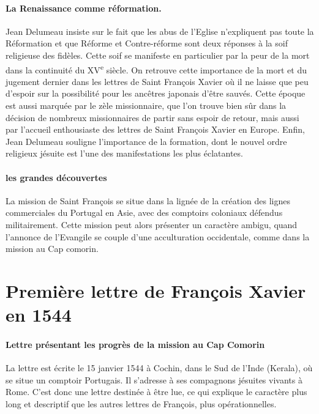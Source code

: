 \paragraph{La Renaissance comme réformation.} Jean Delumeau insiste sur le fait que les abus de l'Eglise n'expliquent pas toute la Réformation et que Réforme et Contre-réforme sont deux réponses à la soif religieuse des fidèles. Cette soif se manifeste en particulier par la peur de la mort dans la continuité du XV\textsuperscript{e} siècle. On retrouve  cette importance de la mort et du jugement dernier dans les lettres de Saint François Xavier où il ne laisse que peu d'espoir sur la possibilité pour les ancêtres japonais d'être sauvés. Cette époque est aussi marquée par le zèle missionnaire, que l'on trouve bien sûr dans la décision de nombreux missionnaires de partir sans espoir de retour, mais aussi par l'accueil enthousiaste des lettres de Saint François Xavier en Europe. Enfin, Jean Delumeau souligne l'importance de la formation, dont le nouvel ordre religieux jésuite est l'une des manifestations les plus éclatantes.



\paragraph{les grandes découvertes} La mission de Saint François se situe dans la lignée de la création des lignes commerciales du Portugal en Asie, avec des comptoirs coloniaux défendus militairement. Cette mission peut alors présenter un caractère ambigu, quand l'annonce de l'Evangile se couple d'une acculturation occidentale, comme dans la mission au Cap comorin. 



\section{Première lettre de François Xavier en 1544}

\paragraph{Lettre présentant les progrès de la mission au Cap Comorin} La lettre est écrite le 15 janvier 1544 à Cochin, dans le Sud de l'Inde (Kerala), où se situe un comptoir Portugais. Il s'adresse à ses compagnons jésuites vivants à Rome. C'est donc une lettre destinée à être lue, ce qui explique le caractère plus long et descriptif que les autres lettres de François, plus opérationnelles. 

